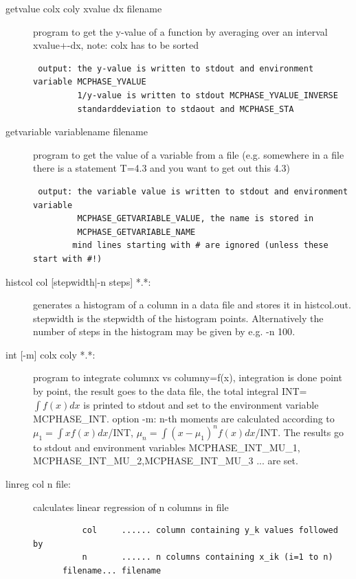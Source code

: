 \begin{description}
\item[\prg getvalue colx coly xvalue dx filename]
program to get the y-value of a function by averaging
 over an interval xvalue+-dx,
 note: colx has to be sorted
\begin{verbatim}
 output: the y-value is written to stdout and environment variable MCPHASE_YVALUE
         1/y-value is written to stdout MCPHASE_YVALUE_INVERSE
         standarddeviation to stdaout and MCPHASE_STA
\end{verbatim}
\item[\prg getvariable variablename filename]
 program to get the value of a variable from a file 
  (e.g. somewhere in a file there is 
   a statement T=4.3 and you want to get out this 4.3)
\begin{verbatim}
 output: the variable value is written to stdout and environment variable 
         MCPHASE_GETVARIABLE_VALUE, the name is stored in 
         MCPHASE_GETVARIABLE_NAME
        mind lines starting with # are ignored (unless these start with #!)
\end{verbatim}
\item[\prg histcol col {[stepwidth|-n steps]} *.*:] generates a histogram of
a column in a data file and stores it in histcol.out. stepwidth is the 
stepwidth of the histogram points. Alternatively the number of
steps in the histogram may be given by e.g. {\prg -n 100}.
\item[\prg int {[-m] }colx coly *.*:]
 program  to integrate columnx vs columny=f(x), integration is done 
point by point, the result goes to the data file, the total integral 
INT=$\int f(x)dx$ is printed to stdout and set to the 
 environment variable MCPHASE\_INT.
 option -m: n-th moments are calculated according to $\mu_1=\int x f(x)dx$/INT, $\mu_n=\int (x-\mu_1)^n f(x)dx$/INT.
The results go to stdout and environment variables MCPHASE\_INT\_MU\_1,
  MCPHASE\_INT\_MU\_2,MCPHASE\_INT\_MU\_3 ... are set.

\item [\prg linreg col n file:] calculates linear regression of n columns in file
\begin{verbatim}
          col     ...... column containing y_k values followed by
          n       ...... n columns containing x_ik (i=1 to n)
	  filename... filename


\end{verbatim}
\end{description}
